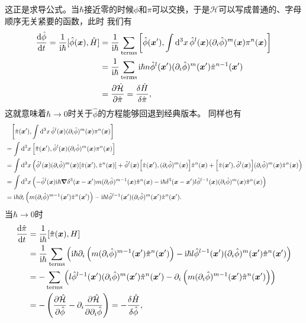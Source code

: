 \documentclass[hyperref, UTF8, a4paper]{ctexart}
\newcommand*{\ii}{\mathrm{i}}
\begin{document}
这正是求导公式。当$\hbar$接近零的时候$\phi$和$\pi$可以交换，于是$\mathcal{H}$可以写成普通的、字母顺序无关紧要的函数，此时
我们有
\[
    \begin{aligned}
        \dv{\hat{\phi}}{t} = \frac{1}{\ii \hbar} [\hat{\phi}(\vb*{x}), \hat{H}] &= \frac{1}{\ii \hbar} \sum_\text{terms} \comm{\hat{\phi}(\vb*{x}')}{\int \dd[3]{x} \hat{\phi}^l(\vb*{x}) (\partial_i \hat{\phi})^m (\vb*{x}) \pi^n(\vb*{x})} \\
        &= \frac{1}{\ii \hbar} \sum_\text{terms} \ii \hbar n \hat{\phi}^l (\vb*{x}') (\partial_i \hat{\phi})^m (\vb*{x}') \hat{\pi}^{n-1}(\vb*{x}') \\
        &= \pdv{\hat{\mathcal{H}}}{\hat{\pi}} = \fdv{\hat{H}}{\hat{\pi}},
    \end{aligned}
\]
这就意味着$\hbar\to 0$时关于$\hat{\phi}$的方程能够回退到经典版本。
同样也有
\[
    \begin{aligned}
        &\quad \comm{\hat{\pi}(\vb*{x}')}{\int \dd[3]{x} \hat{\phi}^l(\vb*{x}) (\partial_i \hat{\phi})^m (\vb*{x}) \pi^n(\vb*{x})} \\ 
        &= \int \dd[3]{x} \comm{\hat{\pi}(\vb*{x}')}{\hat{\phi}^l(\vb*{x}) (\partial_i \hat{\phi})^m (\vb*{x}) \pi^n(\vb*{x})} \\
        &= \int \dd[3]{x} \left( \hat{\phi}^l (\vb*{x}) (\partial_i \hat{\phi} )^m (\vb*{x}) \comm{\hat{\pi}(\vb*{x}')}{\hat{\pi}^n(\vb*{x})} + \hat{\phi}^l (\vb*{x}) \comm{\hat{\pi}(\vb*{x}')}{(\partial_i \hat{\phi})^m (\vb*{x})} \hat{\pi}^n (\vb*{x}) + \comm{\hat{\pi}(\vb*{x}')}{\hat{\phi}^l (\vb*{x})} (\partial_i \hat{\phi})^m (\vb*{x}) \hat{\pi}^n (\vb*{x}) \right) \\
        &= \int \dd[3]{x} \left( - \hat{\phi}^l (\vb*{x}) \ii \hbar \grad{\delta^3 (\vb*{x} - \vb*{x}')} m (\partial_i \hat{\phi})^{m-1} (\vb*{x}) \hat{\pi}^n (\vb*{x}) - \ii \hbar \delta^3(\vb*{x} - \vb*{x}') l \hat{\phi}^{l-1} (\vb*{x}) (\partial_i \hat{\phi})^m (\vb*{x}) \hat{\pi}^n (\vb*{x}) \right) \\
        &= \ii \hbar \partial_i \left(m (\partial_i \hat{\phi})^{m-1} (\vb*{x}') \hat{\pi}^n (\vb*{x}')\right) - \ii \hbar l \hat{\phi}^{l-1} (\vb*{x}') (\partial_i \hat{\phi})^m (\vb*{x}') \hat{\pi}^n (\vb*{x}').
    \end{aligned}
\]
当$\hbar \to 0$时
\[
    \begin{aligned}
        \dv{\hat{\pi}}{t} &= \frac{1}{\ii \hbar} [\hat{\pi}(\vb*{x}), H] \\
        &= \frac{1}{\ii \hbar} \sum_\text{terms} \left(\ii \hbar \partial_i \left(m (\partial_i \hat{\phi})^{m-1} (\vb*{x}') \hat{\pi}^n (\vb*{x}')\right) - \ii \hbar l \hat{\phi}^{l-1} (\vb*{x}') (\partial_i \hat{\phi})^m (\vb*{x}') \hat{\pi}^n (\vb*{x}')\right) \\
        &= - \sum_\text{terms} \left(l \hat{\phi}^{l-1} (\vb*{x}') (\partial_i \hat{\phi})^m (\vb*{x}') \hat{\pi}^n (\vb*{x}') - \partial_i \left(m (\partial_i \hat{\phi})^{m-1} (\vb*{x}') \hat{\pi}^n (\vb*{x}')\right) \right) \\
        &= - \left( \pdv{\hat{\mathcal{H}}}{\hat{\phi}} - \partial_i \pdv{\hat{\mathcal{H}}}{\partial_i \hat{\phi}} \right) = - \fdv{\hat{H}}{\hat{\phi}},
    \end{aligned}
\]
\end{document}
